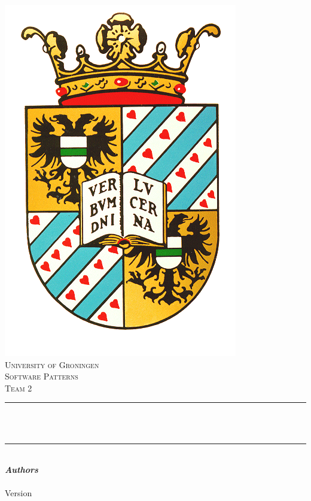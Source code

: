 

\begin{titlepage}
	\centering
    
    \vspace*{0.5 cm}
    \includegraphics[scale = 0.25]{images/rug.png}\\[1.0 cm]	%
    \textsc{\LARGE University of Groningen}\\[0.3cm]
	\textsc{\large {Software Patterns}}\\
	\textsc{\large {Team 2}} \\[2.0 cm]
	\rule{\linewidth}{0.2 mm} \\[0.4 cm]
	{ \huge \bfseries \thetitle}\\
	
	\rule{\linewidth}{0.2 mm} \\[1.5 cm]
			\textbf{\large\emph\textbf{Authors}}\\
			\theauthor
	{\large \thedate}\\[0.25cm]
		Version \VersionNumber \\
		\renewcommand{\headrulewidth}{0pt}
	\vfill

	
\end{titlepage}